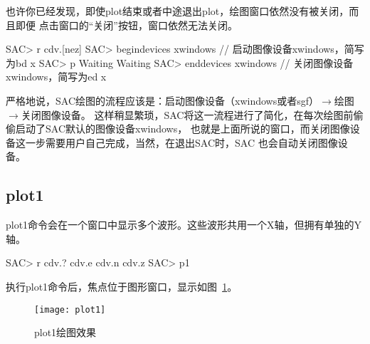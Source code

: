 也许你已经发现，即使plot结束或者中途退出plot，绘图窗口依然没有被关闭，而且即便
点击窗口的``关闭''按钮，窗口依然无法关闭。
\begin{SACCode}
SAC> r cdv.[nez]
SAC> begindevices xwindows      // 启动图像设备xwindows，简写为bd x
SAC> p
Waiting
Waiting
SAC> enddevices xwindows        // 关闭图像设备xwindows，简写为ed x
\end{SACCode}
严格地说，SAC绘图的流程应该是：启动图像设备（xwindows或者sgf）$\rightarrow$绘图$\rightarrow$关闭图像设备。
这样稍显繁琐，SAC将这一流程进行了简化，在每次绘图前偷偷启动了SAC默认的图像设备xwindows，
也就是上面所说的窗口，而关闭图像设备这一步需要用户自己完成，当然，在退出SAC时，SAC
也会自动关闭图像设备。

\subsection{plot1}
plot1命令会在一个窗口中显示多个波形。这些波形共用一个X轴，但拥有单独的Y轴。
\begin{SACCode}
SAC> r cdv.?
cdv.e cdv.n cdv.z
SAC> p1
\end{SACCode}
执行plot1命令后，焦点位于图形窗口，显示如图~\ref{fig:plot1}。
\begin{figure}[H]
\centering
\texttt{[image: plot1]}
\caption{plot1绘图效果}
\label{fig:plot1}
\end{figure}


